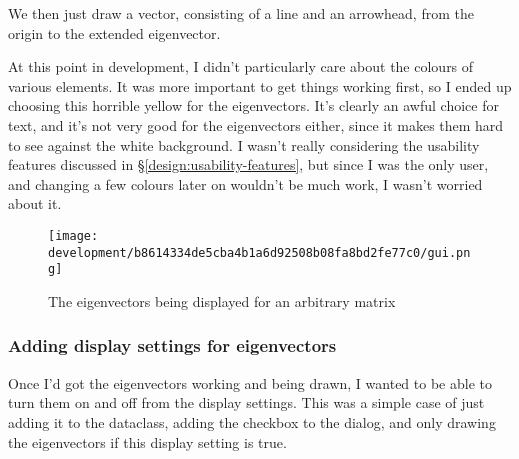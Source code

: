 \documentclass[../development.tex]{subfiles}
\begin{document}
We then just draw a vector, consisting of a line and an arrowhead, from the origin to the extended eigenvector.



At this point in development, I didn't particularly care about the colours of various elements. It was more important to get things working first, so I ended up choosing \textcolor[RGB]{255, 249, 0}{this horrible yellow} for the eigenvectors. It's clearly an awful choice for text, and it's not very good for the eigenvectors either, since it makes them hard to see against the white background. I wasn't really considering the usability features discussed in \S\ref{design:usability-features}, but since I was the only user, and changing a few colours later on wouldn't be much work, I wasn't worried about it.

\begin{figure}[H]
	\centering
	\texttt{[image: development/b8614334de5cba4b1a6d92508b08fa8bd2fe77c0/gui.png]}
	\caption{The eigenvectors being displayed for an arbitrary matrix}
	\label{fig:development:b8614334de5cba4b1a6d92508b08fa8bd2fe77c0:gui.png}
\end{figure}

\subsubsection{Adding display settings for eigenvectors\label{development:implementing-eigenstuffs:adding-display-settings-for-eigenvectors}}

Once I'd got the eigenvectors working and being drawn, I wanted to be able to turn them on and off from the display settings. This was a simple case of just adding it to the  dataclass, adding the checkbox to the dialog, and only drawing the eigenvectors if this display setting is true.



\end{document}
